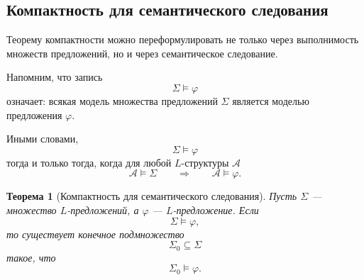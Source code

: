 \documentclass[12pt,a4paper,oneside,openany]{book}
\theoremstyle{definition}
\theoremstyle{plain}
\newtheorem{theorem}{Теорема}[chapter]
\theoremstyle{remark}
\begin{document}
\subsection{Компактность для семантического следования}

Теорему компактности можно переформулировать не только через выполнимость множеств предложений, но и через семантическое следование.

Напомним, что запись
\[
\Sigma\models\varphi
\]
означает: всякая модель множества предложений $\Sigma$ является моделью предложения $\varphi$.

Иными словами,
\[
\Sigma\models\varphi
\]
тогда и только тогда, когда для любой $L$-структуры $\mathcal A$
\[
\mathcal A\models\Sigma
\qquad
\Longrightarrow
\qquad
\mathcal A\models\varphi.
\]

\begin{theorem}[Компактность для семантического следования]
Пусть $\Sigma$ — множество $L$-предложений, а $\varphi$ — $L$-предложение. Если
\[
\Sigma\models\varphi,
\]
то существует конечное подмножество
\[
\Sigma_0\subseteq\Sigma
\]
такое, что
\[
\Sigma_0\models\varphi.
\]
\end{theorem}
\end{document}
